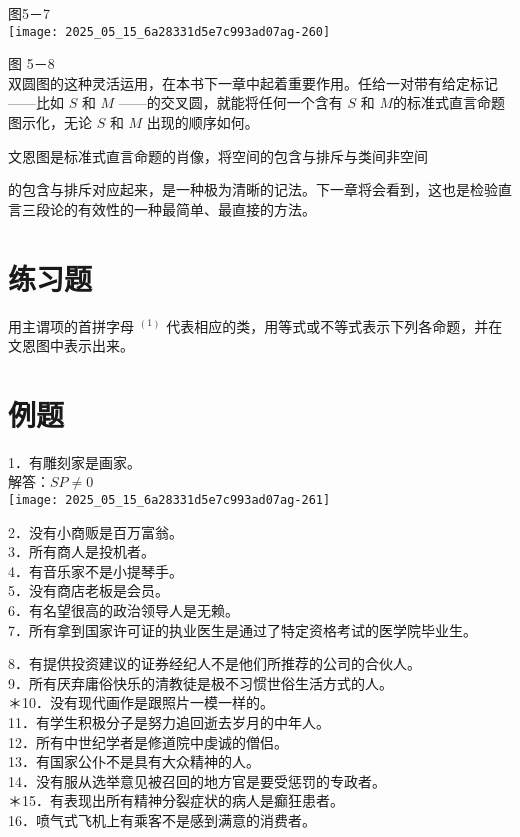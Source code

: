 图5－7\\
\texttt{[image: 2025\_05\_15\_6a28331d5e7c993ad07ag-260]}

图 5－8\\
双圆图的这种灵活运用，在本书下一章中起着重要作用。任给一对带有给定标记——比如 $S$ 和 $M$ ——的交叉圆，就能将任何一个含有 $S$ 和 $M$的标准式直言命题图示化，无论 $S$ 和 $M$ 出现的顺序如何。

文恩图是标准式直言命题的肖像，将空间的包含与排斥与类间非空间

的包含与排斥对应起来，是一种极为清晰的记法。下一章将会看到，这也是检验直言三段论的有效性的一种最简单、最直接的方法。

\section*{练习题}
用主谓项的首拼字母 ${ }^{(1)}$ 代表相应的类，用等式或不等式表示下列各命题，并在文恩图中表示出来。

\section*{例题}
1．有雕刻家是画家。\\
解答：$S P \neq 0$\\
\texttt{[image: 2025\_05\_15\_6a28331d5e7c993ad07ag-261]}

2．没有小商贩是百万富翁。\\
3．所有商人是投机者。\\
4．有音乐家不是小提琴手。\\
5．没有商店老板是会员。\\
6．有名望很高的政治领导人是无赖。\\
7．所有拿到国家许可证的执业医生是通过了特定资格考试的医学院毕业生。

8．有提供投资建议的证券经纪人不是他们所推荐的公司的合伙人。\\
9．所有厌弃庸俗快乐的清教徒是极不习惯世俗生活方式的人。\\
＊10．没有现代画作是跟照片一模一样的。\\
11．有学生积极分子是努力追回逝去岁月的中年人。\\
12．所有中世纪学者是修道院中虔诚的僧侣。\\
13．有国家公仆不是具有大众精神的人。\\
14．没有服从选举意见被召回的地方官是要受惩罚的专政者。\\
＊15．有表现出所有精神分裂症状的病人是癫狂患者。\\
16．喷气式飞机上有乘客不是感到满意的消费者。

